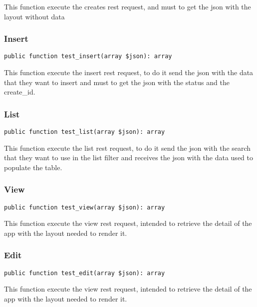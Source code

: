 \documentclass[a4paper]{article}
\begin{document}
This function execute the creates rest request, and must to get the
json with the layout without data

\hypertarget{toc410}{}
\subsubsection{Insert}

\begin{lstlisting}
public function test_insert(array $json): array
\end{lstlisting}

This function execute the insert rest request, to do it send the json with
the data that they want to insert and must to get the json with the status
and the create\_id.

\hypertarget{toc411}{}
\subsubsection{List}

\begin{lstlisting}
public function test_list(array $json): array
\end{lstlisting}

This function execute the list rest request, to do it send the json with
the search that they want to use in the list filter and receives the json
with the data used to populate the table.

\hypertarget{toc412}{}
\subsubsection{View}

\begin{lstlisting}
public function test_view(array $json): array
\end{lstlisting}

This function execute the view rest request, intended to retrieve the detail
of the app with the layout needed to render it.

\hypertarget{toc413}{}
\subsubsection{Edit}

\begin{lstlisting}
public function test_edit(array $json): array
\end{lstlisting}

This function execute the view rest request, intended to retrieve the detail
of the app with the layout needed to render it.
\end{document}
